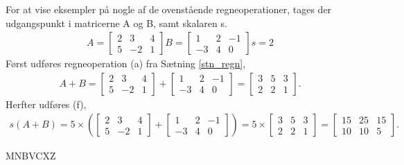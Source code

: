 \begin{eks}
For at vise eksempler på nogle af de ovenstående regneoperationer, tages der udgangspunkt i matricerne A og B, samt skalaren s.
\begin{align*}
A= \begin{bmatrix}
	2 & 3 & 4 \\
	5 & -2 & 1 	
\end{bmatrix}  
B= \begin{bmatrix}
	1 & 2 & -1 \\
	-3 & 4 & 0
\end{bmatrix}  
s=2
\end{align*}
Først udføres regneoperation (a) fra Sætning \ref{stn_regn},
\begin{align*}
A+B= \begin{bmatrix}
	2 & 3 & 4 \\
	5 & -2 & 1 	
\end{bmatrix}  
+ \begin{bmatrix}
	1 & 2 & -1 \\
	-3 & 4 & 0
\end{bmatrix}
= \begin{bmatrix}
	3 & 5 & 3 \\
	2 & 2 & 1
\end{bmatrix}.
\end{align*}
Herfter udføres (f),
\begin{align*}
s(A+B)= 5 \times \left( \begin{bmatrix}
	2 & 3 & 4 \\
	5 & -2 & 1 	
\end{bmatrix}  
+ \begin{bmatrix}
	1 & 2 & -1 \\
	-3 & 4 & 0
\end{bmatrix} \right)
= 5 \times \begin{bmatrix}
	3 & 5 & 3 \\
	2 & 2 & 1
\end{bmatrix}
= \begin{bmatrix}
	15 & 25 & 15 \\
	10 & 10 & 5
\end{bmatrix}.
\end{align*}
\end{eks}


MNBVCXZ